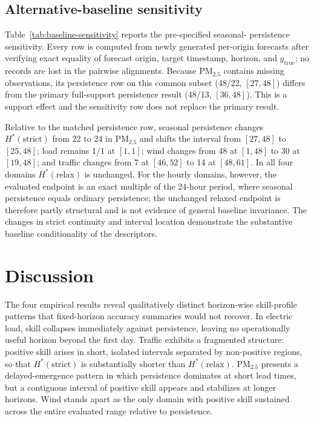 \documentclass[pdflatex]{sn-jnl}
\begin{document}
\subsection{Alternative-baseline sensitivity}
Table~\ref{tab:baseline-sensitivity} reports the pre-specified seasonal-
persistence sensitivity. Every row is computed from newly generated
per-origin forecasts after verifying exact equality of forecast origin, target
timestamp, horizon, and $y_{\mathrm{true}}$; no records are lost in the
pairwise alignments. Because PM$_{2.5}$ contains missing observations, its
persistence row on this common subset (48/22, $[27,48]$) differs from the
primary full-support persistence result (48/13, $[36,48]$). This is a support
effect and the sensitivity row does not replace the primary result.

Relative to the matched persistence row, seasonal persistence changes
$H^*(\mathrm{strict})$ from 22 to 24 in PM$_{2.5}$ and shifts the interval
from $[27,48]$ to $[25,48]$; load remains 1/1 at $[1,1]$; wind changes from
48 at $[1,48]$ to 30 at $[19,48]$; and traffic changes from 7 at $[46,52]$
to 14 at $[48,61]$. In all four domains $H^*(\mathrm{relax})$ is unchanged.
For the hourly domains, however, the evaluated endpoint is an exact multiple
of the 24-hour period, where seasonal persistence equals ordinary persistence;
the unchanged relaxed endpoint is therefore partly structural and is not
evidence of general baseline invariance. The changes in strict continuity and
interval location demonstrate the substantive baseline conditionality of the
descriptors.



\section{Discussion}
The four empirical results reveal qualitatively distinct horizon-wise skill-profile patterns that fixed-horizon accuracy summaries would not recover. In electric load, skill collapses immediately against persistence, leaving no operationally useful horizon beyond the first day. Traffic exhibits a fragmented structure: positive skill arises in short, isolated intervals separated by non-positive regions, so that $H^*(\mathrm{strict})$ is substantially shorter than $H^*(\mathrm{relax})$. PM$_{2.5}$ presents a delayed-emergence pattern in which persistence dominates at short lead times, but a contiguous interval of positive skill appears and stabilizes at longer horizons. Wind stands apart as the only domain with positive skill sustained across the entire evaluated range relative to persistence.
\end{document}

